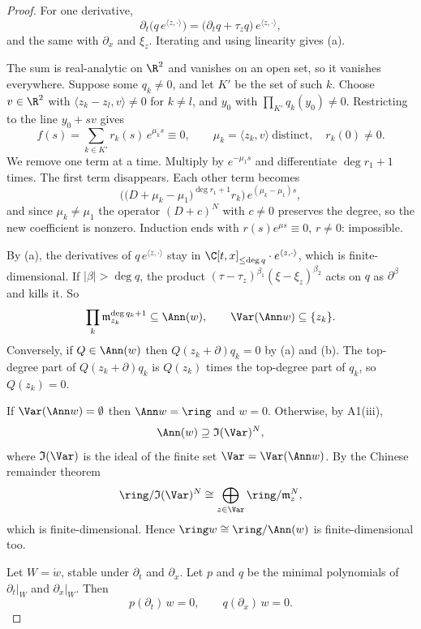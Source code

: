 \begin{proof}
For one derivative,
\[
\partial_t\big(q\,e^{\langle z,\cdot\rangle}\big)=\big(\partial_tq+\tau_zq\big)\,e^{\langle z,\cdot\rangle},
\]
and the same with $\partial_x$ and $\xi_z$. Iterating and using linearity gives (a).

The sum is real-analytic on $\R^2$ and vanishes on an open set, so it vanishes everywhere. Suppose some $q_k\ne0$, and let $K'$ be the set of such $k$. Choose $v\in\R^2$ with $\langle z_k-z_l,v\rangle\ne0$ for $k\ne l$, and $y_0$ with $\prod_{K'}q_k(y_0)\ne0$. Restricting to the line $y_0+sv$ gives
\[
f(s)=\sum_{k\in K'}r_k(s)\,e^{\mu_ks}\equiv0,\qquad \mu_k=\langle z_k,v\rangle\ \text{distinct},\quad r_k(0)\ne0 .
\]
We remove one term at a time. Multiply by $e^{-\mu_1s}$ and differentiate $\deg r_1+1$ times. The first term disappears. Each other term becomes
\[
\Big(\big(D+\mu_k-\mu_1\big)^{\deg r_1+1}r_k\Big)\,e^{(\mu_k-\mu_1)s},
\]
and since $\mu_k\ne\mu_1$ the operator $(D+c)^N$ with $c\ne0$ preserves the degree, so the new coefficient is nonzero. Induction ends with $r(s)e^{\mu s}\equiv0$, $r\ne0$: impossible.

By (a), the derivatives of $q\,e^{\langle z,\cdot\rangle}$ stay in $\C[t,x]_{\le\deg q}\cdot e^{\langle z,\cdot\rangle}$, which is finite-dimensional. If $|\beta|>\deg q$, the product $(\tau-\tau_z)^{\beta_1}(\xi-\xi_z)^{\beta_2}$ acts on $q$ as $\partial^\beta$ and kills it. So
\[
\prod_k\mathfrak m_{z_k}^{\deg q_k+1}\subseteq\Ann(w),\qquad \Var(\Ann w)\subseteq\{z_k\}.
\]
Conversely, if $Q\in\Ann(w)$ then $Q(z_k+\partial)q_k=0$ by (a) and (b). The top-degree part of $Q(z_k+\partial)q_k$ is $Q(z_k)$ times the top-degree part of $q_k$, so $Q(z_k)=0$.

If $\Var(\Ann w)=\emptyset$ then $\Ann w=\ring$ and $w=0$. Otherwise, by A1(iii),
\[
\Ann(w)\supseteq\mathfrak I(\Var)^N,
\]
where $\mathfrak I(\Var)$ is the ideal of the finite set $\Var=\Var(\Ann w)$. By the Chinese remainder theorem
\[
\ring/\mathfrak I(\Var)^N\cong\bigoplus_{z\in\Var}\ring/\mathfrak m_z^N,
\]
which is finite-dimensional. Hence $\ring w\cong\ring/\Ann(w)$ is finite-dimensional too.

Let $W=\ring w$, stable under $\partial_t$ and $\partial_x$. Let $p$ and $q$ be the minimal polynomials of $\partial_t|_W$ and $\partial_x|_W$. Then
\[
p(\partial_t)\,w=0,\qquad q(\partial_x)\,w=0 .
\]


\end{proof}

